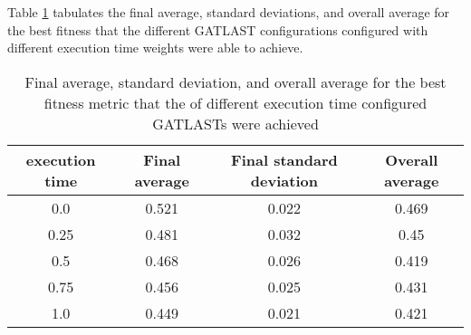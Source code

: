 Table \ref{tab:HP:GA:ExecutionTime:best fitness} tabulates the final average, standard deviations, and overall average for the best fitness that the different GATLAST configurations configured with different execution time weights were able to achieve.
\begin{table}[tbh!]
\centering
\begin{adjustbox}{trim=0cm 0cm 0cm 0cm, clip=true}
\begin{tabular}{|c|c|c|c|}
\hline
execution time & Final average & Final standard deviation & Overall average\\
\hline
0.0 & 0.521 & 0.022 & 0.469\\\hline
0.25 & 0.481 & 0.032 & 0.45\\\hline
0.5 & 0.468 & 0.026 & 0.419\\\hline
0.75 & 0.456 & 0.025 & 0.431\\\hline
1.0 & 0.449 & 0.021 & 0.421\\\hline
\end{tabular}
\end{adjustbox}
\caption{Final average, standard deviation, and overall average for the best fitness metric that the of different execution time configured GATLASTs were achieved}
\label{tab:HP:GA:ExecutionTime:best fitness}
\end{table}